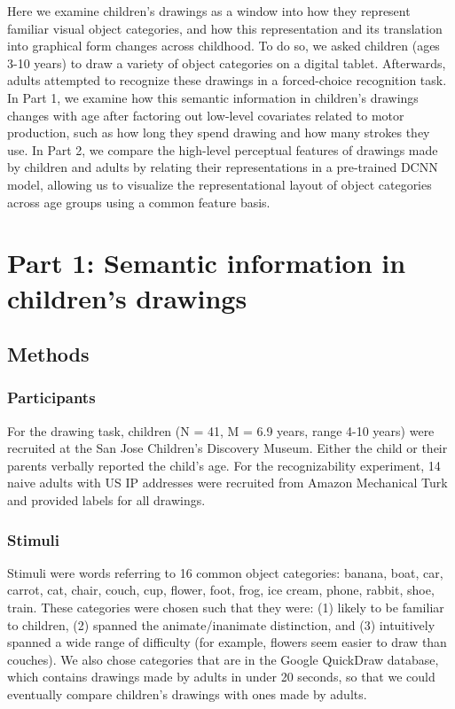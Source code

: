 \documentclass[10pt, letterpaper]{article}
\begin{document}
Here we examine children's drawings as a window into how they represent
familiar visual object categories, and how this representation and its
translation into graphical form changes across childhood. To do so, we
asked children (ages 3-10 years) to draw a variety of object categories
on a digital tablet. Afterwards, adults attempted to recognize these
drawings in a forced-choice recognition task. In Part 1, we examine how
this semantic information in children's drawings changes with age after
factoring out low-level covariates related to motor production, such as
how long they spend drawing and how many strokes they use. In Part 2, we
compare the high-level perceptual features of drawings made by children
and adults by relating their representations in a pre-trained DCNN
model, allowing us to visualize the representational layout of object
categories across age groups using a common feature basis.

\section{Part 1: Semantic information in children's
drawings}\label{part-1-semantic-information-in-childrens-drawings}

\subsection{Methods}\label{methods}

\subsubsection{Participants}\label{participants}

For the drawing task, children (N = 41, M = 6.9 years, range 4-10 years)
were recruited at the San Jose Children's Discovery Museum. Either the
child or their parents verbally reported the child's age. For the
recognizability experiment, 14 naive adults with US IP addresses were
recruited from Amazon Mechanical Turk and provided labels for all
drawings.

\subsubsection{Stimuli}\label{stimuli}

Stimuli were words referring to 16 common object categories: banana,
boat, car, carrot, cat, chair, couch, cup, flower, foot, frog, ice
cream, phone, rabbit, shoe, train. These categories were chosen such
that they were: (1) likely to be familiar to children, (2) spanned the
animate/inanimate distinction, and (3) intuitively spanned a wide range
of difficulty (for example, flowers seem easier to draw than couches).
We also chose categories that are in the Google QuickDraw database,
which contains drawings made by adults in under 20 seconds, so that we
could eventually compare children's drawings with ones made by adults.
\end{document}
